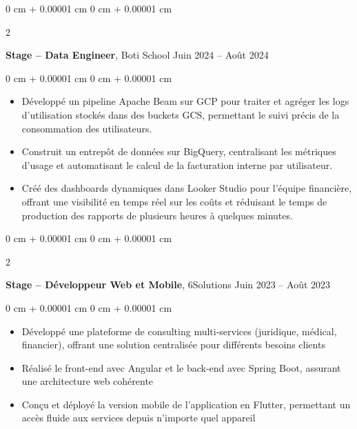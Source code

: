\documentclass[10pt, letterpaper]{article}
\newenvironment{highlights}{
    \begin{itemize}[
        topsep=0.10 cm,
        parsep=0.10 cm,
        partopsep=0pt,
        itemsep=0pt,
        leftmargin=0 cm + 10pt
    ]
}{
    \end{itemize}
} %
\newenvironment{onecolentry}{
    \begin{adjustwidth}{
        0 cm + 0.00001 cm
    }{
        0 cm + 0.00001 cm
    }
}{
    \end{adjustwidth}
} %
\newenvironment{twocolentry}[2][]{
    \onecolentry
    \def\secondColumn{#2}
    \setcolumnwidth{\fill, 4.5 cm}
    \begin{paracol}{2}
}{
    \switchcolumn \raggedleft \secondColumn
    \end{paracol}
    \endonecolentry
} %
\begin{document}
        \vspace{0.2 cm}
        
        \begin{twocolentry}{
            Juin 2024 – Août 2024
        }
            \textbf{Stage – Data Engineer}, Boti School \end{twocolentry}

        \vspace{0.10 cm}
        \begin{onecolentry}
            \begin{highlights}
                \item Développé un pipeline Apache Beam sur GCP pour traiter et agréger les logs d’utilisation stockés dans des buckets GCS, permettant le suivi précis de la consommation des utilisateurs.
                \item Construit un entrepôt de données sur BigQuery, centralisant les métriques d’usage et automatisant le calcul de la facturation interne par utilisateur.
                \item Créé des dashboards dynamiques dans Looker Studio pour l’équipe financière, offrant une visibilité en temps réel sur les coûts et réduisant le temps de production des rapports de plusieurs heures à quelques minutes.
                
            \end{highlights}
        \end{onecolentry}



        \vspace{0.2 cm}

        \begin{twocolentry}{
            Juin 2023 – Août 2023
        }
            \textbf{Stage – Développeur Web et Mobile}, 6Solutions\end{twocolentry}

        \vspace{0.10 cm}
        \begin{onecolentry}
            \begin{highlights}
                \item Développé une plateforme de consulting multi-services (juridique, médical, financier), offrant une solution centralisée pour différents besoins clients 
                \item Réalisé le front-end avec Angular et le back-end avec Spring Boot, assurant une architecture web cohérente
                \item Conçu et déployé la version mobile de l’application en Flutter, permettant un accès fluide aux services depuis n’importe quel appareil
    
            \end{highlights}
        \end{onecolentry}
\end{document}
